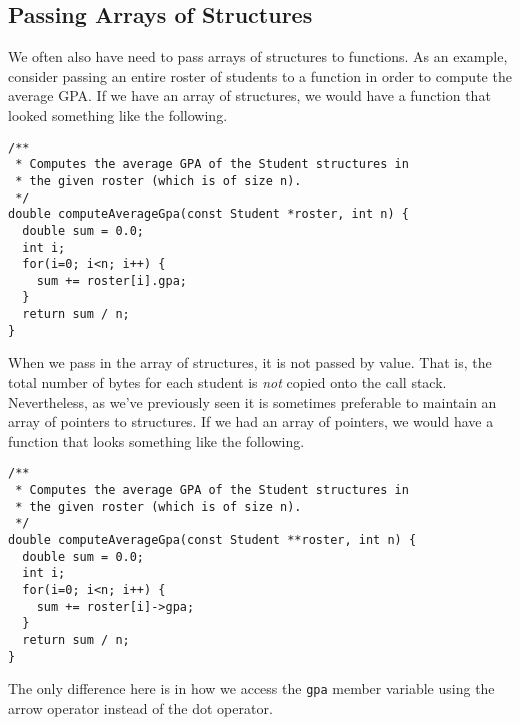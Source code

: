 \subsection{Passing Arrays of Structures}

We often also have need to pass arrays of structures to functions.
As an example, consider passing an entire roster of students to 
a function in order to compute the average GPA.  If we have an
array of structures, we would have a function that looked something
like the following.

\begin{verbatim}
/**
 * Computes the average GPA of the Student structures in
 * the given roster (which is of size n).
 */
double computeAverageGpa(const Student *roster, int n) {
  double sum = 0.0;
  int i;
  for(i=0; i<n; i++) {
    sum += roster[i].gpa;
  }
  return sum / n;
}
\end{verbatim}

When we pass in the array of structures, it is not passed by
value.  That is, the total number of bytes for each student is
\emph{not} copied onto the call stack.  Nevertheless, as we've
previously seen it is sometimes preferable to maintain an array
of pointers to structures.  If we had an array of pointers, we 
would have a function that looks something like the following.

\begin{verbatim}
/**
 * Computes the average GPA of the Student structures in
 * the given roster (which is of size n).
 */
double computeAverageGpa(const Student **roster, int n) {
  double sum = 0.0;
  int i;
  for(i=0; i<n; i++) {
    sum += roster[i]->gpa;
  }
  return sum / n;
}
\end{verbatim}

The only difference here is in how we access the \texttt{gpa}
member variable using the arrow operator instead of the dot 
operator.





